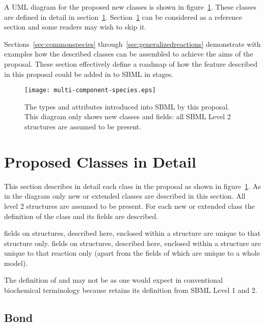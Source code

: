 \documentclass{cekarticle}
\begin{document}
A UML diagram for the proposed new classes is shown in
figure~\ref{fig:multi-component-species-uml}.
These classes are defined in detail in section~\ref{sec:definitions}.
Section~\ref{sec:definitions} can be considered as a reference section and some readers may wish
to skip it.

Sections~\ref{sec:commonspecies} through~\ref{sec:generalizedreactions}
demonstrate with examples how the described classes can be assembled to
achieve the aims of the proposal.  These section effectively define a roadmap
of how the feature described in this proposal could be added in to SBML in stages.

\begin{figure}[h]
  \vspace*{8pt}
  \centering
  \texttt{[image: multi-component-species.eps]}
  \caption{The types and attributes introduced into SBML by this proposal.  This diagram
  only shows new classes and fields: all SBML Level 2 structures are assumed to be present.}
  \label{fig:multi-component-species-uml}
\end{figure}

\section{Proposed Classes in Detail}
\label{sec:definitions}
This section describes in detail each class in the proposal as shown in
figure~\ref{fig:multi-component-species-uml}.
As in the diagram only new or extended classes are described in this section.
All level 2 structures are assumed to be present.
For each new or extended class the definition of the class and its fields are described.

 fields on structures, described here, enclosed within a  structure
are unique to that structure only.
 fields on structures, described here, enclosed within a  structure are
unique to that reaction only (apart from the  fields of 
which are unique to a whole model).

The definition of  and  may not be as one would
expect in conventional biochemical terminology because  retains its definition
from SBML Level 1 and 2.

\subsection{Bond}
\end{document}
